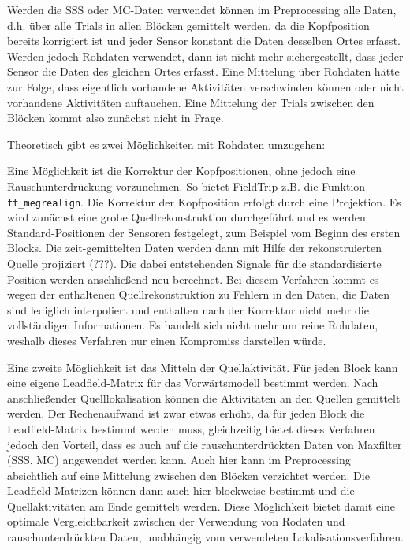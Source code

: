 \documentclass[doc,a4paper,12pt]{apa6}
\begin{document}
Werden die SSS oder MC-Daten verwendet können im Preprocessing alle Daten, d.h. über alle Trials in allen Blöcken gemittelt werden, da die Kopfposition bereits korrigiert ist und jeder Sensor konstant die Daten desselben Ortes erfasst. Werden jedoch Rohdaten verwendet, dann ist nicht mehr sichergestellt, dass jeder Sensor die Daten des gleichen Ortes erfasst. Eine Mittelung über Rohdaten hätte zur Folge, dass eigentlich vorhandene Aktivitäten verschwinden können oder nicht vorhandene Aktivitäten auftauchen. Eine Mittelung der Trials zwischen den Blöcken kommt also zunächst nicht in Frage.

Theoretisch gibt es zwei Möglichkeiten mit Rohdaten umzugehen:

Eine Möglichkeit ist die Korrektur der Kopfpositionen, ohne jedoch eine Rauschunterdrückung vorzunehmen. So bietet FieldTrip z.B. die Funktion \texttt{ft\_megrealign}. Die Korrektur der Kopfposition erfolgt durch eine Projektion. Es wird zunächst eine grobe Quellrekonstruktion durchgeführt und es werden Standard-Positionen der Sensoren festgelegt, zum Beispiel vom Beginn des ersten Blocks. Die zeit-gemittelten Daten werden dann mit Hilfe der rekonstruierten Quelle projiziert (???). Die dabei entstehenden Signale für die standardisierte Position werden anschließend neu berechnet. Bei diesem Verfahren kommt es wegen der enthaltenen Quellrekonstruktion zu Fehlern in den Daten, die Daten sind lediglich interpoliert und enthalten nach der Korrektur nicht mehr die vollständigen Informationen. Es handelt sich nicht mehr um reine Rohdaten, weshalb dieses Verfahren nur einen Kompromiss darstellen würde.

Eine zweite Möglichkeit ist das Mitteln der Quellaktivität. Für jeden Block kann eine eigene Leadfield-Matrix für das Vorwärtsmodell bestimmt werden. Nach anschließender Quelllokalisation können die Aktivitäten an den Quellen gemittelt werden. Der Rechenaufwand ist zwar etwas erhöht, da für jeden Block die Leadfield-Matrix bestimmt werden muss, gleichzeitig bietet dieses Verfahren jedoch den Vorteil, dass es auch auf die rauschunterdrückten Daten von Maxfilter (SSS, MC) angewendet werden kann. Auch hier kann im Preprocessing absichtlich auf eine Mittelung zwischen den Blöcken verzichtet werden. Die Leadfield-Matrizen können dann auch hier blockweise bestimmt und die Quellaktivitäten am Ende gemittelt werden. Diese Möglichkeit bietet damit eine optimale Vergleichbarkeit zwischen der Verwendung von Rodaten und rauschunterdrückten Daten, unabhängig vom verwendeten Lokalisationsverfahren.
\end{document}
